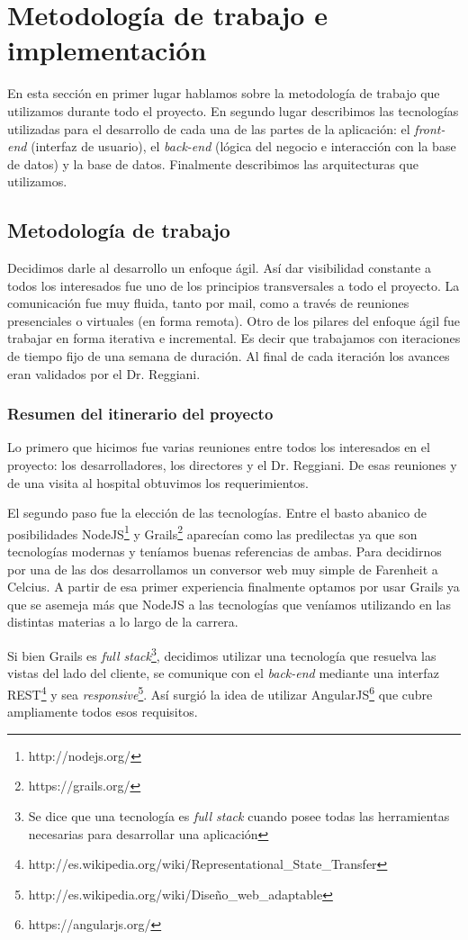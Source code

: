 \section{Metodología de trabajo e implementación}
En esta sección en primer lugar hablamos sobre la metodología de trabajo que utilizamos durante todo el proyecto. En segundo lugar describimos las tecnologías utilizadas para el desarrollo de cada una de las partes de la aplicación: el \textit{front-end} (interfaz de usuario), el \textit{back-end} (lógica del negocio e interacción con la base de datos) y la base de datos. Finalmente describimos las arquitecturas que utilizamos.

\subsection{Metodología de trabajo}
Decidimos darle al desarrollo un enfoque ágil\cite{Shore}. Así dar visibilidad constante a todos los interesados fue uno de los principios transversales a todo el proyecto. La comunicación fue muy fluida, tanto por mail, como a través de reuniones presenciales o virtuales (en forma remota). Otro de los pilares del enfoque ágil fue trabajar en forma iterativa e incremental. Es decir que trabajamos con iteraciones de tiempo fijo de una semana de duración. Al final de cada iteración los avances eran validados por el Dr. Reggiani.

\subsubsection{Resumen del itinerario del proyecto}
Lo primero que hicimos fue varias reuniones entre todos los interesados en el proyecto: los desarrolladores, los directores y el Dr. Reggiani. De esas reuniones y de una visita al hospital obtuvimos los requerimientos.

El segundo paso fue la elección de las tecnologías. Entre el basto abanico de posibilidades NodeJS\footnote{http://nodejs.org/} y Grails\footnote{https://grails.org/} aparecían como las predilectas ya que son tecnologías modernas y teníamos buenas referencias de ambas. Para decidirnos por una de las dos desarrollamos un conversor web muy simple de Farenheit a Celcius. A partir de esa primer experiencia finalmente optamos por usar Grails ya que se asemeja más que NodeJS a las tecnologías que veníamos utilizando en las distintas materias a lo largo de la carrera.

Si bien Grails es \textit{full stack}\footnote{Se dice que una tecnología es \textit{full stack} cuando posee todas las herramientas necesarias para desarrollar una aplicación}, decidimos utilizar una tecnología que resuelva las vistas del lado del cliente, se comunique con el \textit{back-end} mediante una interfaz REST\footnote{http://es.wikipedia.org/wiki/Representational\_State\_Transfer} 
y sea \textit{responsive}\footnote{http://es.wikipedia.org/wiki/Diseño\_web\_adaptable}. Así surgió la idea de utilizar AngularJS\footnote{https://angularjs.org/} que cubre ampliamente todos esos requisitos.

